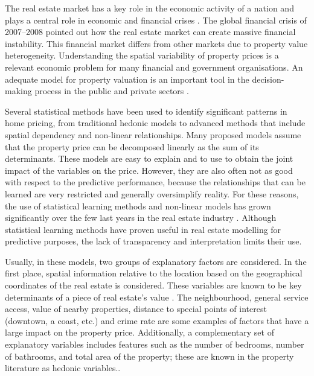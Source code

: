 \documentclass[smallextended,natbib]{svjour3}\usepackage[]{graphicx}\usepackage[]{xcolor}
\newcommand{\1}[1]{\mathbbm{1}_{#1}}
\begin{document}
The real estate market has a key role in the economic activity of a nation and plays a central role in economic and financial crises \citep{mooya2016standard}. The global financial crisis of 2007--2008 pointed out how the real estate market can create massive financial instability. This financial market differs from other markets due to property value heterogeneity. Understanding the spatial variability of property prices is a relevant economic problem for many financial and government organisations. An adequate model for property valuation is an important tool in the decision-making process in the public and private sectors \citep{osland2010,case2004}. 

Several statistical methods have been used to identify significant patterns in home pricing, from traditional hedonic models \citep{rosen1974} to advanced methods that include spatial dependency and non-linear relationships. Many proposed models assume that the property price can be decomposed linearly as the sum of its determinants. These models are easy to explain and to use to obtain the joint impact of the variables on the price. However, they are also often not as good with respect to the predictive performance, because the relationships that can be learned are very restricted and generally oversimplify reality. For these reasons, the use of statistical learning methods and non-linear models has grown significantly over the few last years in the real estate industry  \citep{limsombunchai2004, yoo2012,  park2015, goyeneche2017}. Although statistical learning methods have proven useful in real estate modelling for predictive purposes, the lack of transparency and interpretation limits their use.

Usually, in these models, two groups of explanatory factors are considered. In the first place, spatial information relative to the location based on the geographical coordinates of the real estate is considered. These variables are known to be key determinants of a piece of real estate's value \citep{kiel2008}. The neighbourhood, general service access, value of nearby properties, distance to special points of interest (downtown, a coast, etc.) and crime rate are some examples of factors that have a large impact on the property price. Additionally, a complementary set of explanatory variables includes features such as the number of bedrooms, number of bathrooms, and total area of the property; these are known in the property literature as hedonic variables.\citep{sirmans2005}. 
\end{document}
